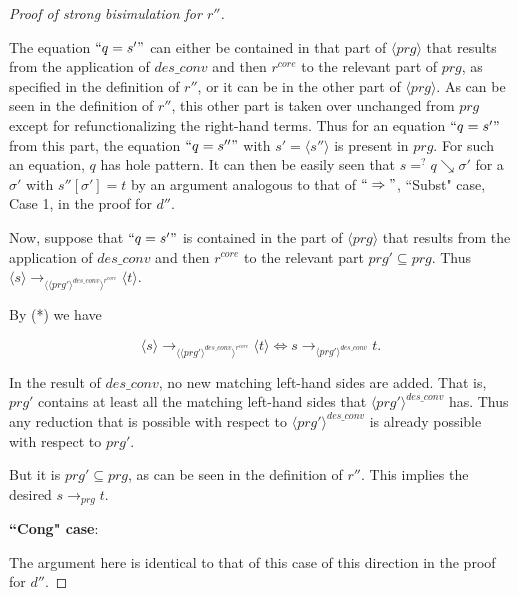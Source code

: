 \documentclass[11pt]{article} %
\begin{document}
\begin{proof}[Proof of strong bisimulation for $r''$]
\begin{enumerate}
The equation $`` q = s' "$ can either be contained in that part of $\langle prg \rangle$ that results from the application of $des\_conv$ and then $r^{core}$ to the relevant part of $prg$, as specified in the definition of $r''$, or it can be in the other part of $\langle prg \rangle$. As can be seen in the definition of $r''$, this other part is taken over unchanged from $prg$ except for refunctionalizing the right-hand terms. Thus for an equation $`` q = s' "$ from this part, the equation $`` q = s'' "$ with $s' = \langle s'' \rangle$ is present in $prg$. For such an equation, $q$ has hole pattern. It can then be easily seen that $s =^? q \searrow \sigma'$ for a $\sigma'$ with $s''[\sigma'] = t$ by an argument analogous to that of $`` \Rightarrow "$, ``Subst" case, Case 1, in the proof for $d''$.

Now, suppose that $`` q = s' "$ is contained in the part of $\langle prg \rangle$ that results from the application of $des\_conv$ and then $r^{core}$ to the relevant part $prg' \subseteq prg$. Thus $\langle s \rangle \longrightarrow_{\langle \langle prg' \rangle^{des\_conv} \rangle^{r^{core}}} \langle t \rangle$.

By (*) we have

\begin{equation*}
\langle s \rangle \longrightarrow_{\langle \langle prg' \rangle^{des\_conv} \rangle^{r^{core}}} \langle t \rangle \iff s \longrightarrow_{\langle prg' \rangle^{des\_conv}} t.
\end{equation*}

In the result of $des\_conv$, no new matching left-hand sides are added. That is, $prg'$ contains at least all the matching left-hand sides that $\langle prg' \rangle^{des\_conv}$ has. Thus any reduction that is possible with respect to $\langle prg' \rangle^{des\_conv}$ is already possible with respect to $prg'$.

But it is $prg' \subseteq prg$, as can be seen in the definition of $r''$. This implies the desired $s \longrightarrow_{prg} t$.
\end{enumerate}

\item \textbf{``Cong" case}:

The argument here is identical to that of this case of this direction in the proof for $d''$.

\end{proof}
\end{document}
